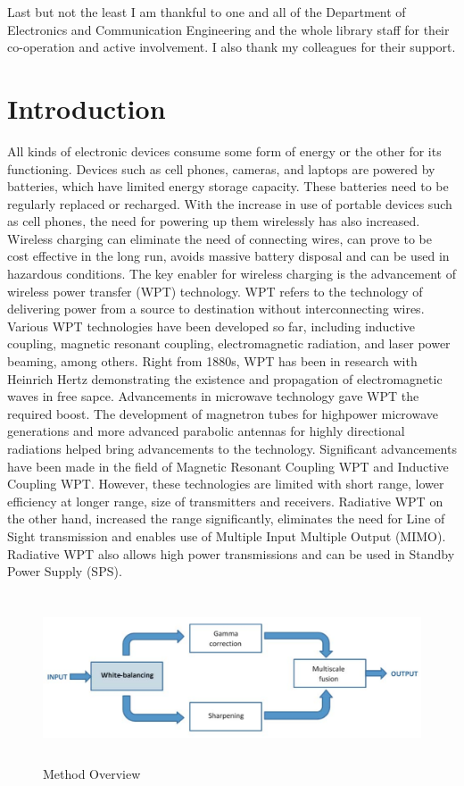 \documentclass[hidelinks, 12pt]{report}
\begin{document}
Last but not the least I am thankful to one and all of the Department of Electronics and Communication Engineering and the whole library staff for their co-operation and active involvement. I also thank my colleagues for their support.
\hbox{} \newpage 
{} 
\pagestyle{fancy}
\chapter{Introduction}
\justify
All kinds of electronic devices consume some form of energy or the other for its functioning. Devices such as cell phones, cameras, and laptops are powered by batteries, which have limited energy storage capacity. These batteries need to be regularly replaced or recharged. With the increase in use of portable devices such as cell phones, the need for powering up them wirelessly has also increased. Wireless charging can eliminate the need of connecting wires, can prove to be cost effective in the long run, avoids massive battery disposal and can be used in hazardous conditions. The key enabler for wireless charging is the advancement of wireless power transfer (WPT) technology. WPT refers to the technology of delivering power from a source to destination without interconnecting wires. Various WPT technologies have been developed so far, including inductive coupling, magnetic resonant coupling, electromagnetic radiation, and laser power beaming, among others. Right from 1880s, WPT has been in research with Heinrich Hertz demonstrating the existence and propagation of electromagnetic waves in free sapce. Advancements in microwave technology gave WPT the required boost. The development of magnetron tubes for highpower microwave generations and more advanced parabolic antennas for highly directional radiations helped bring advancements to the technology. Significant advancements have been made in the field of Magnetic Resonant Coupling WPT and Inductive Coupling WPT. However, these technologies are limited with short range, lower efficiency at longer range, size of transmitters and receivers. Radiative WPT on the other hand, increased the range significantly, eliminates the need for Line of Sight transmission and enables use of Multiple Input Multiple Output (MIMO). Radiative WPT also allows high power transmissions and can be used in Standby Power Supply (SPS). 
\begin{figure}[H]
\centering
\includegraphics[width=15cm,height=5cm]{Block.png}
\caption[Method Overview]{Method Overview}
\label{Method Overview}
\end{figure}
\end{document}
